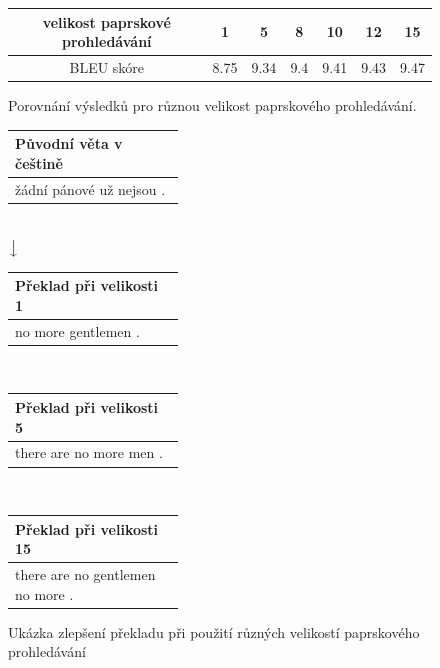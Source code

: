 \begin{figure}[H]
    \begin{center}
        \begin{tabular}{c|c|c|c|c|c|c}
          velikost paprskové prohledávání & 1 & 5 & 8 & 10 & 12 & 15 \\
          \hline
          BLEU skóre & 8.75 & 9.34 & 9.4 & 9.41 & 9.43 & 9.47\\
          \hline
        \end{tabular}
    \end{center}
	\caption{Porovnání výsledků pro různou velikost paprskového prohledávání.}
	\label{table:resultsExperiment4}
\end{figure}

\begin{figure}[H]
    \begin{center}
        \begin{tabular}{| >{\centering\arraybackslash}p{0.4\linewidth} |}
          \hline
          Původní věta v češtině\\
          \hline
          žádní pánové už nejsou .\\
          \hline
        \end{tabular}
        \\ \vspace{2.5mm}
        $\big\downarrow$
        \\ \vspace{2.5mm}
        \begin{tabular}{| >{\centering\arraybackslash}p{0.4\linewidth} |}
          \hline
          Překlad při velikosti 1\\
          \hline
          no more gentlemen .\\
          \hline
        \end{tabular}
        \\ \vspace{5mm}
        \begin{tabular}{| >{\centering\arraybackslash}p{0.4\linewidth} |}
          \hline
          Překlad při velikosti 5\\
          \hline
          there are no more men .\\
          \hline
        \end{tabular}
        \\ \vspace{5mm}
        \begin{tabular}{| >{\centering\arraybackslash}p{0.4\linewidth} |}
          \hline
          Překlad při velikosti 15\\
          \hline
          there are no gentlemen no more .\\
          \hline
        \end{tabular}
    \end{center}
	\caption{Ukázka zlepšení překladu při použití různých velikostí paprskového prohledávání}
	\label{img:beamTranslation}
\end{figure}

